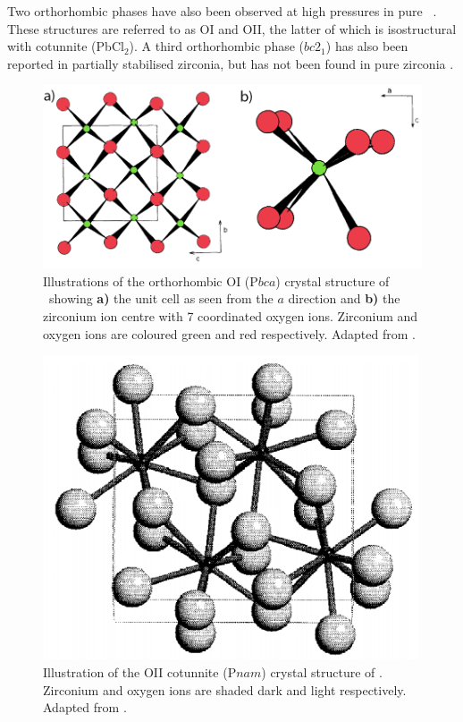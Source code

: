 Two orthorhombic phases have also been observed at high pressures in pure \zirconia\ \cite{howard1991crystal}. These structures are referred to as OI and OII, the latter of which is isostructural with cotunnite (PbCl$_{2}$). A third orthorhombic phase ($bc2_{1}$) has also been reported in partially stabilised zirconia, but has not been found in pure zirconia \cite{kisi1998crystal}.


\begin{figure}[htp]
  \centering
      \includegraphics[width=\linewidth]{images/orthorhombic_I.png}
  \caption[Illustrations of the orthorhombic OI (P$bca$) crystal structure of \zirconia\ showing \textbf{a)} the unit cell as seen from the $a$ direction and \textbf{b)} the zirconium ion centre with 7 coordinated oxygen ions. Zirconium and oxygen ions are coloured green and red respectively.]{Illustrations of the orthorhombic OI (P$bca$) crystal structure of \zirconia\ showing \textbf{a)} the unit cell as seen from the $a$ direction and \textbf{b)} the zirconium ion centre with 7 coordinated oxygen ions. Zirconium and oxygen ions are coloured green and red respectively. Adapted from \cite{kisi1989crystal}.}
  \label{fig:orthorhombic_I}
\end{figure}


\begin{figure}[htp]
  \centering
      \includegraphics[height=9cm]{images/orthorhombic_II.png}
  \caption[Illustration of the OII cotunnite (P$nam$) crystal structure of \zirconia . Zirconium and oxygen ions are shaded dark and light respectively.]{Illustration of the OII cotunnite (P$nam$) crystal structure of \zirconia . Zirconium and oxygen ions are shaded dark and light respectively. Adapted from \cite{Haines1997}.}
  \label{fig:cotunnite_structure}
\end{figure}

